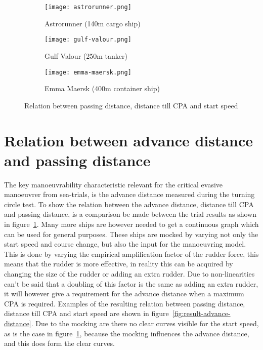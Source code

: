 \begin{figure}[!p]
	\centering
	\begin{subfigure}[b]{0.6\textwidth}
		\texttt{[image: astrorunner.png]} 
		\caption{Astrorunner (140m  cargo ship)} 
	\end{subfigure}
	\begin{subfigure}[b]{0.6\linewidth}
		\texttt{[image: gulf-valour.png]} 
		\caption{Gulf Valour (250m tanker)} 
	\end{subfigure}
	\begin{subfigure}[b]{0.6\textwidth}
		\texttt{[image: emma-maersk.png]} 
		\caption{Emma Maersk (400m container ship)} 
	\end{subfigure}
	\caption{Relation between passing distance, distance till CPA and start speed} 
	\label{fig:result-distance-passing-distance-start-speed} 
\end{figure}

\section{Relation between advance distance and passing distance}
\label{sec:relation-advance-distance}
The key manoeuvrability characteristic relevant for the critical evasive manoeuvrer from sea-trials, is the advance distance measured during the turning circle test. To show the relation between the advance distance, distance till CPA and passing distance, is a comparison be made between the trial results as shown in figure~\ref{fig:result-distance-passing-distance-start-speed}. Many more ships are however needed to get a continuous graph which can be used for general purposes. These ships are mocked by varying not only the start speed and course change, but also the input for the manoeuvring model. This is done by varying the empirical amplification factor of the rudder force, this means that the rudder is more effective, in reality this can be acquired by changing the size of the rudder or adding an extra rudder. Due to non-linearities can't be said that a doubling of this factor is the same as adding an extra rudder, it will however give a requirement for the advance distance when a maximum CPA is required. Examples of the resulting relation between passing distance, distance till CPA and start speed are shown in figure~\ref{fig:result-advance-distance}. Due to the mocking are there no clear curves visible for the start speed, as is the case in figure~\ref{fig:result-distance-passing-distance-start-speed}, because the mocking influences the advance distance, and this does form the clear curves.

